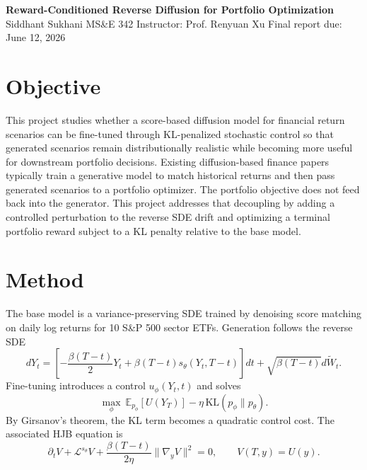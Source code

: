 \documentclass[10pt]{article}
\begin{document}
\begin{center}
{\Large \textbf{Reward-Conditioned Reverse Diffusion for Portfolio Optimization}}\\
Siddhant Sukhani \quad MS\&E 342 \quad Instructor: Prof. Renyuan Xu \quad Final report due: June 12, 2026
\end{center}

\section*{Objective}
This project studies whether a score-based diffusion model for financial return scenarios can be fine-tuned through KL-penalized stochastic control so that generated scenarios remain distributionally realistic while becoming more useful for downstream portfolio decisions. Existing diffusion-based finance papers typically train a generative model to match historical returns and then pass generated scenarios to a portfolio optimizer. The portfolio objective does not feed back into the generator. This project addresses that decoupling by adding a controlled perturbation to the reverse SDE drift and optimizing a terminal portfolio reward subject to a KL penalty relative to the base model.

\section*{Method}
The base model is a variance-preserving SDE trained by denoising score matching on daily log returns for 10 S\&P 500 sector ETFs. Generation follows the reverse SDE
\[
dY_t=\left[-\frac{\beta(T-t)}{2}Y_t+\beta(T-t)s_\theta(Y_t,T-t)\right]dt+\sqrt{\beta(T-t)}d\widetilde W_t.
\]
Fine-tuning introduces a control $u_\phi(Y_t,t)$ and solves
\[
\max_{\phi}\ \mathbb{E}_{p_\phi}[U(Y_T)]-\eta\,\mathrm{KL}(p_\phi\|p_\theta).
\]
By Girsanov's theorem, the KL term becomes a quadratic control cost. The associated HJB equation is
\[
\partial_t V+\mathcal{L}^{s_\theta}V+\frac{\beta(T-t)}{2\eta}\|\nabla_y V\|^2=0,\qquad V(T,y)=U(y).
\]
\end{document}
